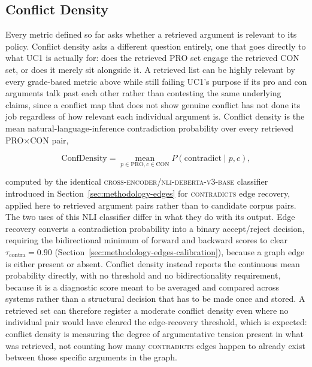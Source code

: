 \subsection{Conflict Density}
\label{sec:evaluation-uc1-conflictdensity}

Every metric defined so far asks whether a retrieved argument is relevant to its policy. Conflict
density asks a different question entirely, one that goes directly to what UC1 is actually for: does
the retrieved PRO set engage the retrieved CON set, or does it merely sit alongside it. A retrieved
list can be highly relevant by every grade-based metric above while still failing UC1's purpose if
its pro and con arguments talk past each other rather than contesting the same underlying claims,
since a conflict map that does not show genuine conflict has not done its job regardless of how
relevant each individual argument is. Conflict density is the mean natural-language-inference
contradiction probability over every retrieved PRO$\times$CON pair,

\begin{equation}
\mathrm{ConfDensity} = \operatorname*{mean}_{p \in \text{PRO}, c \in \text{CON}} P(\text{contradict} \mid p, c),
\label{eq:evaluation-confdensity}
\end{equation}

\noindent computed by the identical \textsc{cross-encoder/nli-deberta-v3-base} classifier
\cite{he2023debertav3} introduced in Section~\ref{sec:methodology-edges} for \textsc{contradicts}
edge recovery, applied here to retrieved argument pairs rather than to candidate corpus pairs. The
two uses of this NLI classifier differ in what they do with its output. Edge recovery converts a
contradiction probability into a binary accept/reject decision, requiring the bidirectional minimum
of forward and backward scores to clear $\tau_{\text{contra}} = 0.90$
(Section~\ref{sec:methodology-edges-calibration}), because a graph edge is either present or absent.
Conflict density instead reports the continuous mean probability directly, with no threshold and no
bidirectionality requirement, because it is a diagnostic score meant to be averaged and compared
across systems rather than a structural decision that has to be made once and stored. A retrieved
set can therefore register a moderate conflict density even where no individual pair would have
cleared the edge-recovery threshold, which is expected: conflict density is measuring the degree of
argumentative tension present in what was retrieved, not counting how many \textsc{contradicts}
edges happen to already exist between those specific arguments in the graph.

